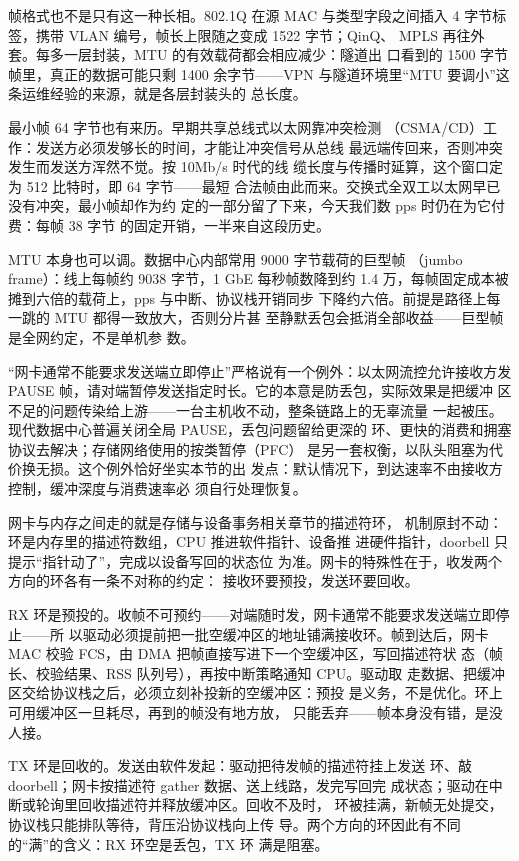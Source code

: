 帧格式也不是只有这一种长相。802.1Q 在源 MAC 与类型字段之间插入
4 字节标签，携带 VLAN 编号，帧长上限随之变成 1522 字节；QinQ、
MPLS 再往外套。每多一层封装，MTU 的有效载荷都会相应减少：隧道出
口看到的 1500 字节帧里，真正的数据可能只剩 1400 余字节——VPN
与隧道环境里“MTU 要调小”这条运维经验的来源，就是各层封装头的
总长度。

最小帧 64 字节也有来历。早期共享总线式以太网靠冲突检测
（CSMA/CD）工作：发送方必须发够长的时间，才能让冲突信号从总线
最远端传回来，否则冲突发生而发送方浑然不觉。按 10Mb/s 时代的线
缆长度与传播时延算，这个窗口定为 512 比特时，即 64 字节——最短
合法帧由此而来。交换式全双工以太网早已没有冲突，最小帧却作为约
定的一部分留了下来，今天我们数 pps 时仍在为它付费：每帧 38 字节
的固定开销，一半来自这段历史。

MTU 本身也可以调。数据中心内部常用 9000 字节载荷的巨型帧
（jumbo frame）：线上每帧约 9038 字节，1 GbE 每秒帧数降到约 1.4
万，每帧固定成本被摊到六倍的载荷上，pps 与中断、协议栈开销同步
下降约六倍。前提是路径上每一跳的 MTU 都得一致放大，否则分片甚
至静默丢包会抵消全部收益——巨型帧是全网约定，不是单机参
数。

“网卡通常不能要求发送端立即停止”严格说有一个例外：以太网流控允许接收方发 PAUSE
帧，请对端暂停发送指定时长。它的本意是防丢包，实际效果是把缓冲
区不足的问题传染给上游——一台主机收不动，整条链路上的无辜流量
一起被压。现代数据中心普遍关闭全局 PAUSE，丢包问题留给更深的
环、更快的消费和拥塞协议去解决；存储网络使用的按类暂停（PFC）
是另一套权衡，以队头阻塞为代价换无损。这个例外恰好坐实本节的出
发点：默认情况下，到达速率不由接收方控制，缓冲深度与消费速率必
须自行处理恢复。

网卡与内存之间走的就是存储与设备事务相关章节的描述符环，
机制原封不动：环是内存里的描述符数组，CPU 推进软件指针、设备推
进硬件指针，doorbell 只提示“指针动了”，完成以设备写回的状态位
为准。网卡的特殊性在于，收发两个方向的环各有一条不对称的约定：
接收环要预投，发送环要回收。

RX 环是预投的。收帧不可预约——对端随时发，网卡通常不能要求发送端立即停止——所
以驱动必须提前把一批空缓冲区的地址铺满接收环。帧到达后，网卡
MAC 校验 FCS，由 DMA 把帧直接写进下一个空缓冲区，写回描述符状
态（帧长、校验结果、RSS 队列号），再按中断策略通知 CPU。驱动取
走数据、把缓冲区交给协议栈之后，必须立刻补投新的空缓冲区：预投
是义务，不是优化。环上可用缓冲区一旦耗尽，再到的帧没有地方放，
只能丢弃——帧本身没有错，是没人接。

TX 环是回收的。发送由软件发起：驱动把待发帧的描述符挂上发送
环、敲 doorbell；网卡按描述符 gather 数据、送上线路，发完写回完
成状态；驱动在中断或轮询里回收描述符并释放缓冲区。回收不及时，
环被挂满，新帧无处提交，协议栈只能排队等待，背压沿协议栈向上传
导。两个方向的环因此有不同的“满”的含义：RX 环空是丢包，TX 环
满是阻塞。

